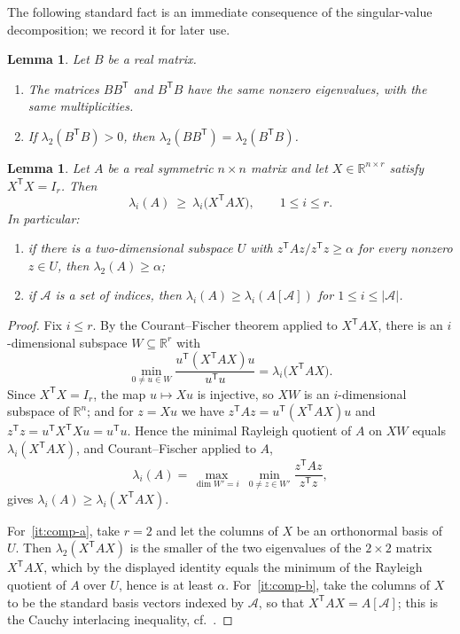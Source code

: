 \documentclass[11pt,reqno]{amsart}
\numberwithin{equation}{section}
\theoremstyle{plain}
\newtheorem{lemma}[theorem]{Lemma}
\theoremstyle{definition}
\newcommand{\R}{\mathbb{R}}
\newcommand{\T}{\mathsf{T}}
\newcommand{\Aset}{\mathcal A}
\begin{document}
The following standard fact is an immediate consequence of the singular-value decomposition;
we record it for later use.

\begin{lemma}\label{lem:gram}
Let $B$ be a real matrix.
\begin{enumerate}[label=\textup{(\alph*)},leftmargin=2.6em]
\item The matrices $BB^{\T}$ and $B^{\T}B$ have the same nonzero eigenvalues,
with the same multiplicities.
\item\label{it:gram-b} If $\lambda_2(B^{\T}B)>0$, then $\lambda_2(BB^{\T})=\lambda_2(B^{\T}B)$.
\end{enumerate}
\end{lemma}



\begin{lemma}\label{lem:compress}
Let $A$ be a real symmetric $n\times n$ matrix and let $X\in\R^{n\times r}$ satisfy
$X^{\T}X=I_r$. Then
\[
  \lambda_i(A)\ \ge\ \lambda_i\bigl(X^{\T}AX\bigr),\qquad 1\le i\le r .
\]
In particular:
\begin{enumerate}[label=\textup{(\alph*)},leftmargin=2.6em]
\item\label{it:comp-a} if there is a two-dimensional subspace $U$ with
$z^{\T}Az/z^{\T}z\ge\alpha$ for every nonzero $z\in U$, then $\lambda_2(A)\ge\alpha$;
\item\label{it:comp-b} if $\Aset$ is a set of indices, then
$\lambda_i(A)\ge\lambda_i(A[\Aset])$ for $1\le i\le|\Aset|$.
\end{enumerate}
\end{lemma}

\begin{proof}
Fix $i\le r$. By the Courant--Fischer theorem applied to $X^{\T}AX$, there is an
$i$-dimensional subspace $W\subseteq\R^{r}$ with
\[
  \min_{0\ne u\in W}\frac{u^{\T}(X^{\T}AX)u}{u^{\T}u}=\lambda_i\bigl(X^{\T}AX\bigr).
\]
Since $X^{\T}X=I_r$, the map $u\mapsto Xu$ is injective, so $XW$ is an $i$-dimensional subspace
of $\R^{n}$; and for $z=Xu$ we have $z^{\T}Az=u^{\T}(X^{\T}AX)u$ and
$z^{\T}z=u^{\T}X^{\T}Xu=u^{\T}u$. Hence the minimal Rayleigh quotient of $A$ on $XW$ equals
$\lambda_i(X^{\T}AX)$, and Courant--Fischer applied to $A$,
\[
  \lambda_i(A)=\max_{\dim W'=i}\ \min_{0\ne z\in W'}\frac{z^{\T}Az}{z^{\T}z},
\]
gives $\lambda_i(A)\ge\lambda_i(X^{\T}AX)$.

For~\ref{it:comp-a}, take $r=2$ and let the columns of $X$ be an orthonormal basis of $U$. Then
$\lambda_2(X^{\T}AX)$ is the smaller of the two eigenvalues of the $2\times2$ matrix
$X^{\T}AX$, which by the displayed identity equals the minimum of the Rayleigh quotient of $A$
over $U$, hence is at least $\alpha$. For~\ref{it:comp-b}, take the columns of $X$ to be the
standard basis vectors indexed by $\Aset$, so that $X^{\T}AX=A[\Aset]$; this is the Cauchy
interlacing inequality, cf.~\cite{HornJohnson}.
\end{proof}
\end{document}
